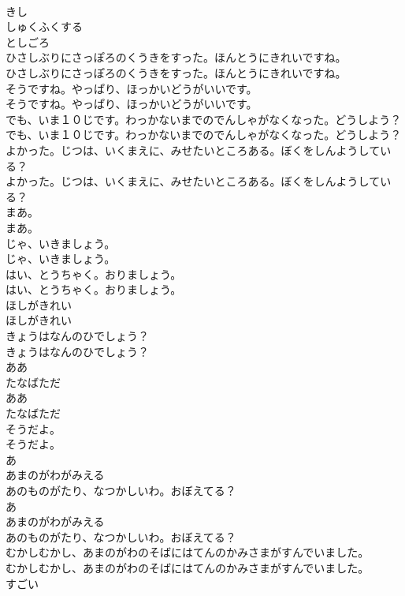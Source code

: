 \documentclass[8pt]{extreport}
\begin{document}
\begin{CJK}{UTF8}{min}
\\	きし
\\	しゅくふくする
\\	としごろ
\\	ひさしぶりにさっぽろのくうきをすった。ほんとうにきれいですね。
\\	ひさしぶりにさっぽろのくうきをすった。ほんとうにきれいですね。
\\	そうですね。やっぱり、ほっかいどうがいいです。
\\	そうですね。やっぱり、ほっかいどうがいいです。
\\	でも、いま１０じです。わっかないまでのでんしゃがなくなった。どうしよう？
\\	でも、いま１０じです。わっかないまでのでんしゃがなくなった。どうしよう？
\\	よかった。じつは、いくまえに、みせたいところある。ぼくをしんようしている？
\\	よかった。じつは、いくまえに、みせたいところある。ぼくをしんようしている？
\\	まあ。
\\	まあ。
\\	じゃ、いきましょう。
\\	じゃ、いきましょう。
\\	はい、とうちゃく。おりましょう。
\\	はい、とうちゃく。おりましょう。
\\	ほしがきれい
\\	ほしがきれい
\\	きょうはなんのひでしょう？
\\	きょうはなんのひでしょう？
\\	ああ
\\	たなばただ
\\	ああ
\\	たなばただ
\\	そうだよ。
\\	そうだよ。
\\	あ
\\	あまのがわがみえる
\\	あのものがたり、なつかしいわ。おぼえてる？
\\	あ
\\	あまのがわがみえる
\\	あのものがたり、なつかしいわ。おぼえてる？
\\	むかしむかし、あまのがわのそばにはてんのかみさまがすんでいました。
\\	むかしむかし、あまのがわのそばにはてんのかみさまがすんでいました。
\\	すごい

\end{CJK}
\end{document}
